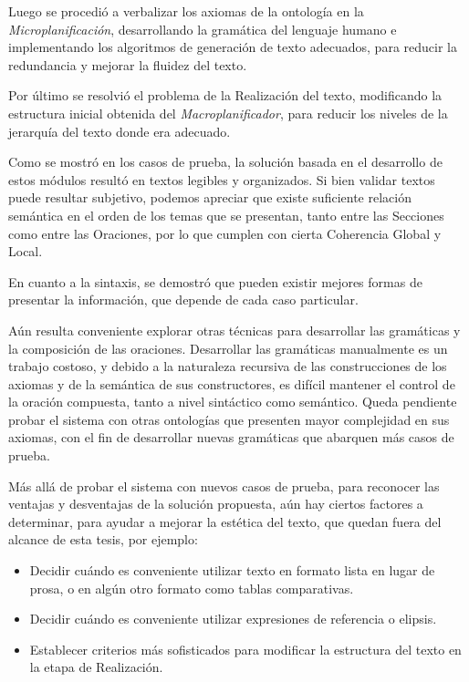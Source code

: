 Luego se procedió a verbalizar los axiomas de la ontología en la \emph{Microplanificación}, desarrollando la gramática del lenguaje humano e implementando los algoritmos de generación de texto adecuados, para reducir la redundancia y mejorar la fluidez del texto. 

Por último se resolvió el problema de la Realización del texto, modificando la estructura inicial obtenida del \emph{Macroplanificador}, para reducir los niveles de la jerarquía del texto donde era adecuado. 

Como se mostró en los casos de prueba, la solución basada en el desarrollo de estos módulos resultó en textos legibles y organizados. Si bien validar textos puede resultar subjetivo, podemos apreciar que existe suficiente relación semántica en el orden de los temas que se presentan, tanto entre las Secciones como entre las Oraciones, por lo que cumplen con cierta Coherencia Global y Local.

En cuanto a la sintaxis, se demostró que pueden existir mejores formas de presentar la información, que depende de cada caso particular.

Aún resulta conveniente explorar otras técnicas para desarrollar las gramáticas y la composición de las oraciones. Desarrollar las gramáticas manualmente es un trabajo costoso, y debido a la naturaleza recursiva de las construcciones de los axiomas y de la semántica de sus constructores, es difícil mantener el control de la oración compuesta, tanto a nivel sintáctico como semántico. Queda pendiente probar el sistema con otras ontologías que presenten mayor complejidad en sus axiomas, con el fin de desarrollar nuevas gramáticas que abarquen más casos de prueba.

Más allá de probar el sistema con nuevos casos de prueba, para reconocer las ventajas y desventajas de la solución propuesta, aún hay ciertos factores a determinar, para ayudar a mejorar la estética del texto, que quedan fuera del alcance de esta tesis, por ejemplo:
\begin{itemize}
    \item Decidir cuándo es conveniente utilizar texto en formato lista en lugar de prosa, o en algún otro formato como tablas comparativas.
    \item Decidir cuándo es conveniente utilizar expresiones de referencia o elipsis.
    \item Establecer criterios más sofisticados para modificar la estructura del texto en la etapa de Realización. 
\end{itemize}
